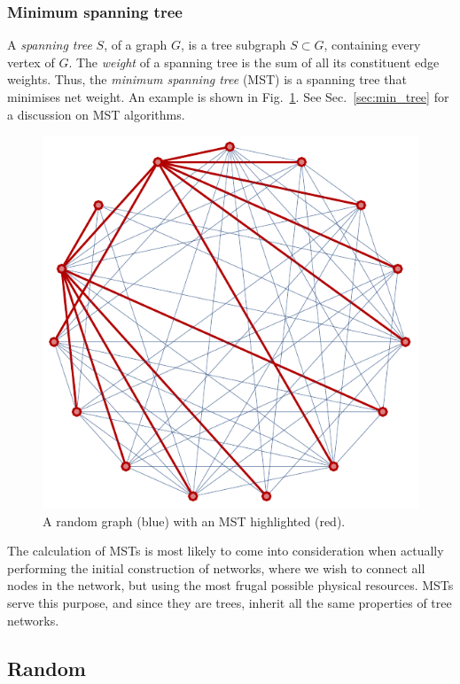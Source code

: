 \documentclass[aps, rmp, twocolumn, amsmath, amssymb, nofootinbib, superscriptaddress, longbibliography, floatfix, table-of-contents, eqsecnum]{revtex4-1}
\begin{document}
%
%

\subsubsection{Minimum spanning tree} \label{sec:graph_MST} 

A \textit{spanning tree} $S$, of a graph $G$, is a tree subgraph \mbox{$S\subset G$}, containing every vertex of $G$. The \textit{weight} of a spanning tree is the sum of all its constituent edge weights. Thus, the \textit{minimum spanning tree} (MST) is a spanning tree that minimises net weight. An example is shown in Fig.~\ref{fig:mst}. See Sec.~\ref{sec:min_tree} for a discussion on MST algorithms.

\begin{figure}[!htb]
\includegraphics[width=0.8\columnwidth]{mst}
\caption{A random graph (blue) with an MST highlighted (red).} \label{fig:mst}
\end{figure}

The calculation of MSTs is most likely to come into consideration when actually performing the initial construction of networks, where we wish to connect all nodes in the network, but using the most frugal possible physical resources. MSTs serve this purpose, and since they are trees, inherit all the same properties of tree networks.

%
%

\subsection{Random} 
\end{document}
